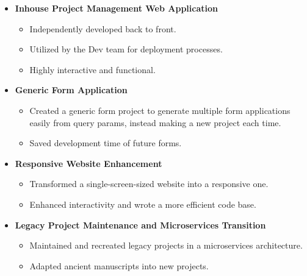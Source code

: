 \documentclass[oneside]{article}
\begin{document}
{\begin{minipage}[t][\dimexpr\textheight-2\fboxrule-2\fboxsep\relax][t]{\dimexpr0.55\textwidth-2\fboxrule-2\fboxsep\relax}
\begin{itemize}
            \item \textbf{\normalsize Inhouse Project Management Web Application}
            \vspace{-0.5\baselineskip} 
            \begin{itemize}
                \item Independently developed back to front.
                \item Utilized by the Dev team for deployment processes.
                \item Highly interactive and functional.
            \end{itemize}
            \vspace{0.5\baselineskip} 

            \item \textbf{\normalsize Generic Form Application}
            \vspace{-0.5\baselineskip} 
            \begin{itemize}
                \item Created a generic form project to generate multiple form applications easily from query params, instead making a new project each time.
                \item Saved development time of future forms.
            \end{itemize}
            \vspace{0.5\baselineskip} 

            \item \textbf{\normalsize Responsive Website Enhancement}
            \vspace{-0.5\baselineskip} 
            \begin{itemize}
                \item Transformed a single-screen-sized website into a responsive one.
                \item Enhanced interactivity and wrote a more efficient code base.
            \end{itemize}
            \vspace{0.5\baselineskip} 

            \item \textbf{\normalsize Legacy Project Maintenance and Microservices Transition}
            \vspace{-0.5\baselineskip} 
            \begin{itemize}
                \item Maintained and recreated legacy projects in a microservices architecture.
                \item Adapted ancient manuscripts into new projects.
            \end{itemize}
            \vspace{0.5\baselineskip} 


\end{itemize}
\end{minipage}}
\end{document}
